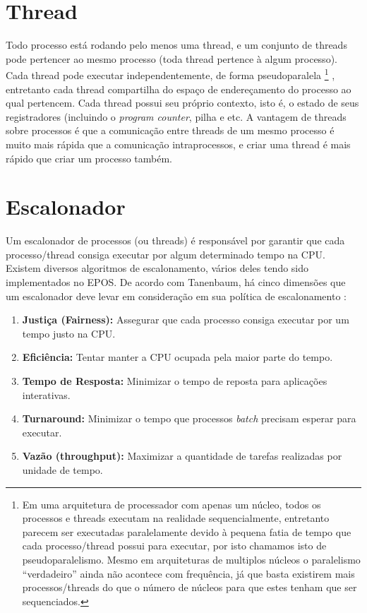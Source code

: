 \section{Thread}
Todo processo está rodando pelo menos uma thread, e um conjunto de threads pode pertencer ao mesmo processo (toda thread pertence à algum processo). Cada thread pode executar independentemente, de forma pseudoparalela
\footnote{Em uma arquitetura de processador com apenas um núcleo, todos os processos e threads executam na realidade sequencialmente, entretanto parecem ser executadas paralelamente devido à pequena fatia de tempo que cada processo/thread possui para executar, por isto chamamos isto de pseudoparalelismo. Mesmo em arquiteturas de multiplos núcleos o paralelismo ``verdadeiro'' ainda não acontece com frequência, já que basta existirem mais processos/threads do que o número de núcleos para que estes tenham que ser sequenciados.}
, entretanto cada thread compartilha do espaço de endereçamento do processo ao qual pertencem. Cada thread possui seu próprio contexto, isto é, o estado de seus registradores (incluindo o \emph{program counter}, pilha e etc.
A vantagem de threads sobre processos é que a comunicação entre threads de um mesmo processo é muito mais rápida que a comunicação intraprocessos, e criar uma thread é mais rápido que criar um processo também.

\section{Escalonador}
\label{escalonador}

Um escalonador de processos (ou threads) é responsável por garantir que cada processo/thread consiga executar por algum determinado tempo na CPU. Existem diversos algoritmos de escalonamento, vários deles tendo sido implementados no EPOS. De acordo com Tanenbaum, há cinco dimensões que um escalonador deve levar em consideração em sua política de escalonamento \cite{tanenbaum}:

\begin{enumerate}
\item \textbf{Justiça (Fairness):} Assegurar que cada processo consiga executar por um tempo justo na CPU.
\item \textbf{Eficiência:} Tentar manter a CPU ocupada pela maior parte do tempo.
\item \textbf{Tempo de Resposta:} Minimizar o tempo de reposta para aplicações interativas.
\item \textbf{Turnaround:} Minimizar o tempo que processos \emph{batch} precisam esperar para executar.
\item \textbf{Vazão (throughput):} Maximizar a quantidade de tarefas realizadas por unidade de tempo.
\end{enumerate}

